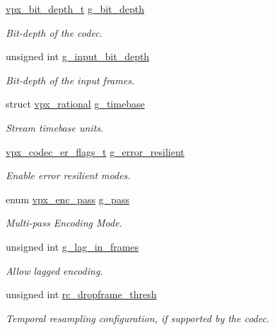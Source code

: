 \begin{DoxyCompactItemize}
\hyperlink{group__codec_ga6272c4d226fe40a57855e4e34737a51b}{vpx\+\_\+bit\+\_\+depth\+\_\+t} \hyperlink{structvpx__codec__enc__cfg_aaaa7bca27fd42f24a2c215b247ba9190}{g\+\_\+bit\+\_\+depth}
\begin{DoxyCompactList}\small\item\em Bit-\/depth of the codec. \end{DoxyCompactList}\item 
unsigned int \hyperlink{structvpx__codec__enc__cfg_abebad3c575d7a5ba6c09a52fedb7d762}{g\+\_\+input\+\_\+bit\+\_\+depth}
\begin{DoxyCompactList}\small\item\em Bit-\/depth of the input frames. \end{DoxyCompactList}\item 
struct \hyperlink{structvpx__rational}{vpx\+\_\+rational} \hyperlink{structvpx__codec__enc__cfg_a6498d378e4c29ef3e22258289e481087}{g\+\_\+timebase}
\begin{DoxyCompactList}\small\item\em Stream timebase units. \end{DoxyCompactList}\item 
\hyperlink{group__encoder_ga77e0e1fff62556a4f4d54c84467a41f3}{vpx\+\_\+codec\+\_\+er\+\_\+flags\+\_\+t} \hyperlink{structvpx__codec__enc__cfg_a4e17173b66ca0d7dfba9978625d7ba76}{g\+\_\+error\+\_\+resilient}
\begin{DoxyCompactList}\small\item\em Enable error resilient modes. \end{DoxyCompactList}\item 
enum \hyperlink{group__encoder_ga476c5417f9c15a1dc5d3f68fa44c493f}{vpx\+\_\+enc\+\_\+pass} \hyperlink{structvpx__codec__enc__cfg_a70d62d87aae7d1168746577f14a6dccf}{g\+\_\+pass}
\begin{DoxyCompactList}\small\item\em Multi-\/pass Encoding Mode. \end{DoxyCompactList}\item 
unsigned int \hyperlink{structvpx__codec__enc__cfg_a992668d9e30305f3f7ab2672ea31a890}{g\+\_\+lag\+\_\+in\+\_\+frames}
\begin{DoxyCompactList}\small\item\em Allow lagged encoding. \end{DoxyCompactList}\item 
unsigned int \hyperlink{structvpx__codec__enc__cfg_a619269f9a6904de58c4790e6806a3905}{rc\+\_\+dropframe\+\_\+thresh}
\begin{DoxyCompactList}\small\item\em Temporal resampling configuration, if supported by the codec. \end{DoxyCompactList}\item 

\end{DoxyCompactItemize}

